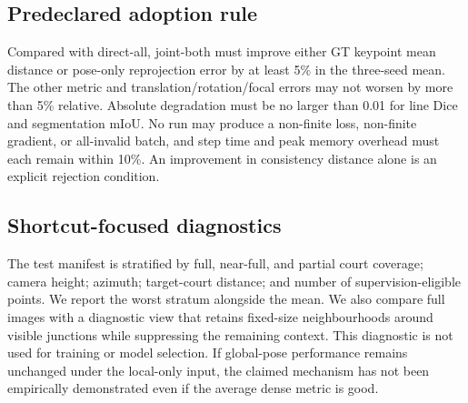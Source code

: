 \subsection{Predeclared adoption rule}

Compared with direct-all, joint-both must improve either GT keypoint mean
distance or pose-only reprojection error by at least 5\% in the three-seed mean.
The other metric and translation/rotation/focal errors may not worsen by more
than 5\% relative.  Absolute degradation must be no larger than 0.01 for line
Dice and segmentation mIoU.  No run may produce a non-finite loss, non-finite
gradient, or all-invalid batch, and step time and peak memory overhead must each
remain within 10\%.  An improvement in consistency distance alone is an
explicit rejection condition.

\subsection{Shortcut-focused diagnostics}

The test manifest is stratified by full, near-full, and partial court coverage;
camera height; azimuth; target-court distance; and number of
supervision-eligible points.  We report the worst stratum alongside the mean.  We also compare full
images with a diagnostic view that retains fixed-size neighbourhoods around
visible junctions while suppressing the remaining context.  This diagnostic is
not used for training or model selection.  If global-pose performance remains
unchanged under the local-only input, the claimed mechanism has not been
empirically demonstrated even if the average dense metric is good.
